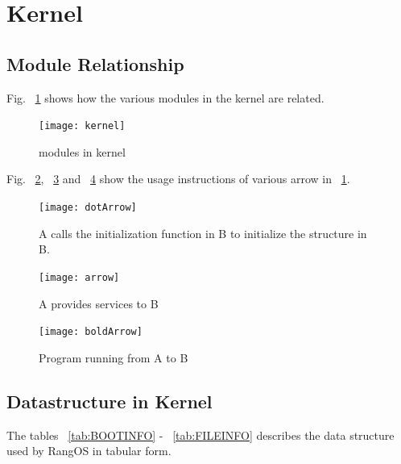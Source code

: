 \documentclass{swfcthesis}
\begin{document}
\section{Kernel}
\label{sec:kernel}

\subsection{Module Relationship}
\label{sec:overview-1}

Fig. ~\ref{fig:kernel} shows how the various modules in
the kernel are related.
\begin{figure}[!htbp]
  \centering
  \texttt{[image: kernel]}
  \caption{modules in kernel}
  \label{fig:kernel}
\end{figure}

Fig. ~\ref{fig:dotArrow}, ~\ref{fig:arrow} and ~\ref{fig:boldArrow} show the usage
instructions of various arrow in ~\ref{fig:kernel}.
\begin{figure}[!htbp]
  \centering
  \texttt{[image: dotArrow]}
  \caption{A calls the initialization function in B to initialize the structure in B.}
  \label{fig:dotArrow}
\end{figure}

\begin{figure}[!htbp]
  \centering
  \texttt{[image: arrow]}
  \caption{A provides services to B}
  \label{fig:arrow}
\end{figure}

\begin{figure}[!htbp]
  \centering
  \texttt{[image: boldArrow]}
  \caption{Program running from A to B}
  \label{fig:boldArrow}
\end{figure}

\subsection{Datastructure in Kernel}
\label{sec:datastructure-kernel}

The tables ~\ref{tab:BOOTINFO} - ~\ref{tab:FILEINFO} describes the data structure used by RangOS in tabular form.
\end{document}
